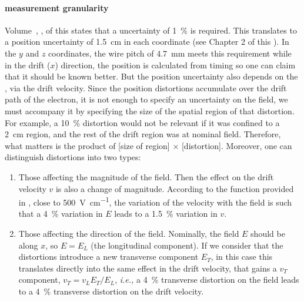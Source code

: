 \paragraph{\efield measurement granularity}

Volume~\volnumberphysics, \voltitlephysics, of this 
states that a  uncertainty of \SI{1}{\%} is required. 
This translates to a position uncertainty of \SI{1.5}{\cm} in each coordinate %
(see Chapter 2 of this ). In the $y$ and $z$ coordinates, the wire pitch of \SI{4.7}{\mm} meets this requirement while in the drift ($x$) direction, the position is calculated from timing so one can claim that it should be known better.
But the position uncertainty also depends on the \efield, via the drift velocity. Since the position distortions accumulate over the drift path of the electron, it is not enough to specify an uncertainty on the field, we must accompany it by specifying the size of the spatial region of that distortion. For example, a \SI{10}{\%} distortion would not be relevant if it was confined to a \SI{2}{\cm} region, and the rest of the drift region was at nominal field.
Therefore, what matters is the product of [size of region] $\times$ [distortion]. Moreover, one can distinguish distortions into two types:
\begin{enumerate}
\item Those affecting the magnitude of the field. Then the effect on the drift velocity $v$ is also a change of magnitude. According to the function provided in \cite{Walkowiak:2000wf}, close to \SI{500}{\V\per\cm}, the variation of the velocity with the field is such that a \SI{4}{\%} variation in $E$ leads to a \SI{1.5}{\%} variation in $v$.
\item Those affecting the direction of the field. Nominally, the field $E$ should be along $x$, so $E = E_L$ (the longitudinal component). If we consider that the distortions introduce a new transverse component $E_T$, in this case this translates directly into the same effect in the drift velocity, that gains a $v_T$ component, $v_T=v_L  E_T/E_L $, {\it i.e.,} a \SI{4}{\%} transverse distortion on the field leads to a \SI{4}{\%} transverse distortion on the drift velocity.
\end{enumerate}

